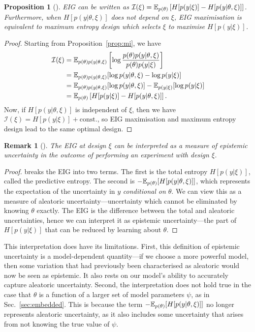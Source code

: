 \documentclass[a4paper, 10pt]{report}
\theoremstyle{plain}
\newtheorem{proposition}[theorem]{Proposition}
\newtheorem{remark}[theorem]{Remark}
\begin{document}
	\begin{proposition}[\citet{sebastiani2000maximum}]
		\label{prop:sebastiani}
		EIG can be written as $\mathcal{I}(\xi) = \mathbb{E}_{p(\theta)}\left[H[p(y|\xi)] - H[p(y|\theta,\xi)]\right]$.
		Furthermore, when $H[p(y|\theta,\xi)]$ does not depend on $\xi$, EIG maximisation is equivalent to maximum entropy design which selects $\xi$ to maximise $H[p(y|\xi)]$.
	\end{proposition}
	\begin{proof}
		Starting from Proposition~\ref{prop:mi}, we have
		\begin{align}
		\mathcal{I}(\xi) &= \mathbb{E}_{p(\theta)p(y|\theta,\xi)}\left[\log \frac{p(\theta)p(y|\theta,\xi)}{p(\theta)p(y|\xi)}\right]\\
		&= \mathbb{E}_{p(\theta)p(y|\theta,\xi)}[\log p(y|\theta,\xi) - \log p(y|\xi)]\\
		&= \mathbb{E}_{p(\theta)p(y|\theta,\xi)}[\log p(y|\theta,\xi)]-\mathbb{E}_{p(y|\xi)}[\log p(y|\xi)]\\
		&= \mathbb{E}_{p(\theta)}\left[H[p(y|\xi)] - H[p(y|\theta,\xi)]\right].
		\label{eq:sebastiani}
		\end{align}
		Now, if $H[p(y|\theta,\xi)]$ is independent of $\xi$, then we have $\mathcal{I}(\xi) = H[p(y|\xi)] + \text{const.}$, so EIG maximisation and maximum entropy design lead to the same optimal design.
	\end{proof}
	
	\begin{remark}[\citet{smith2018understanding}]
		The EIG at design $\xi$ can be interpreted as a measure of epistemic uncertainty in the outcome of performing an experiment with design $\xi$.	
	\end{remark}
	\begin{proof}
		 breaks the EIG into two terms. The first is the total entropy $H[p(y|\xi)]$, called the predictive entropy. The second is $-\mathbb{E}_{p(\theta)}[H[p(y|\theta,\xi)]]$, which represents the expectation of the uncertainty in $y$ \emph{conditional on $\theta$}. We can view this as a measure of aleatoric uncertainty---uncertainty which cannot be eliminated by knowing $\theta$ exactly. The EIG is the difference between the total and aleatoric uncertainties, hence we can interpret it as epistemic uncertainty---the part of $H[p(y|\xi)]$ that can be reduced by learning about $\theta$.
	\end{proof}
	This interpretation does have its limitations. First, this definition of epistemic uncertainty is a model-dependent quantity---if we choose a more powerful model, then some variation that had previously been characterised as aleatoric would now be seen as epistemic. It also rests on our model's ability to accurately capture aleatoric uncertainty. Second, the interpretation does not hold true in the case that $\theta$ is a function of a larger set of model parameters $\psi$, as in Sec.~\ref{sec:embedded}. This is because the term $-\mathbb{E}_{p(\theta)}[H[p(y|\theta,\xi)]]$ no longer represents aleatoric uncertainty, as it also includes some uncertainty that arises from not knowing the true value of $\psi$.
	
\end{document}
